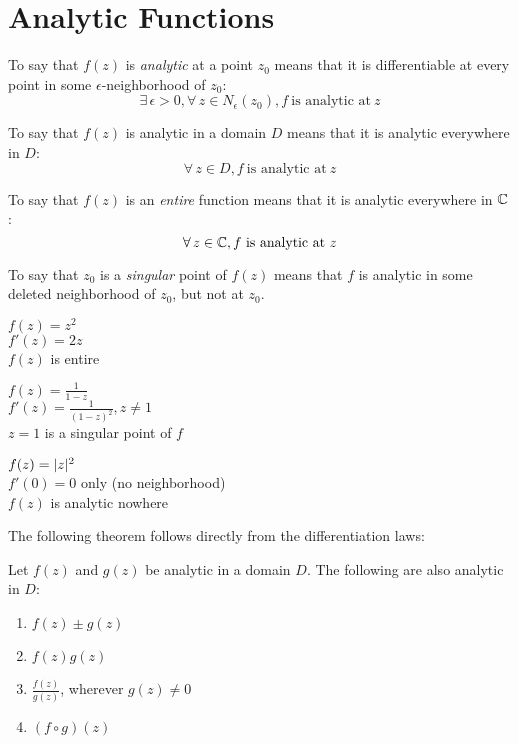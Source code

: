 \documentclass[letterpaper,12pt,fleqn]{article}
\newcommand{\e}{\epsilon}
\begin{document}
\section*{Analytic Functions}

\begin{definition}
  To say that $f(z)$ is \emph{analytic} at a point $z_0$ means that it is
  differentiable at every point in some $\e$-neighborhood of $z_0$:
  \[\exists\,\e>0,\forall\,z\in N_{\e}(z_0), f\ \mbox{is analytic at}\ z\]

  To say that $f(z)$ is analytic in a domain $D$ means that it is analytic
  everywhere in $D$:
  \[\forall\,z\in D, f\ \mbox{is analytic at}\ z\]

  To say that $f(z)$ is an \emph{entire} function means that it is analytic
  everywhere in $\mathbb{C}$:
  \[\forall\,z\in\C, f\ \mbox{is analytic at}\ z\]

  To say that $z_0$ is a \emph{singular} point of $f(z)$ means that $f$ is
  analytic in some deleted neighborhood of $z_0$, but not at $z_0$.
\end{definition}

\begin{example}
  \begin{minipage}[t]{1.5in}
    $f(z)=z^2$ \\
    $f'(z)=2z$ \\
    $f(z)$ is entire
  \end{minipage}
  \begin{minipage}[t]{2.5in}
    $f(z)=\frac{1}{1-z}$ \\
    $f'(z)=\frac{1}{(1-z)^2}, z\ne1$ \\
    $z=1$ is a singular point of $f$
  \end{minipage}
  \begin{minipage}[t]{2.5in}
    $f(z)=\lvert z\rvert^2$ \\
    $f'(0)=0$ only (no neighborhood) \\
    $f(z)$ is analytic nowhere
  \end{minipage}
\end{example}

The following theorem follows directly from the differentiation laws:

\begin{theorem}
  Let $f(z)$ and $g(z)$ be analytic in a domain $D$. The following are also
  analytic in $D$:
  \begin{enumerate}
  \item $f(z)\pm g(z)$
  \item $f(z)g(z)$
  \item $\frac{f(z)}{g(z)}$, wherever $g(z)\ne0$
  \item $(f\circ g)(z)$
  \end{enumerate}
\end{theorem}
\end{document}
